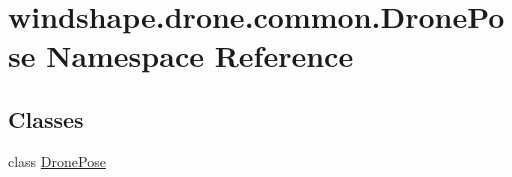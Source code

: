 \hypertarget{namespacewindshape_1_1drone_1_1common_1_1_drone_pose}{}\section{windshape.\+drone.\+common.\+Drone\+Pose Namespace Reference}
\label{namespacewindshape_1_1drone_1_1common_1_1_drone_pose}
\subsection*{Classes}
\begin{DoxyCompactItemize}
\item 
class \mbox{\hyperlink{classwindshape_1_1drone_1_1common_1_1_drone_pose_1_1_drone_pose}{Drone\+Pose}}
\end{DoxyCompactItemize}
